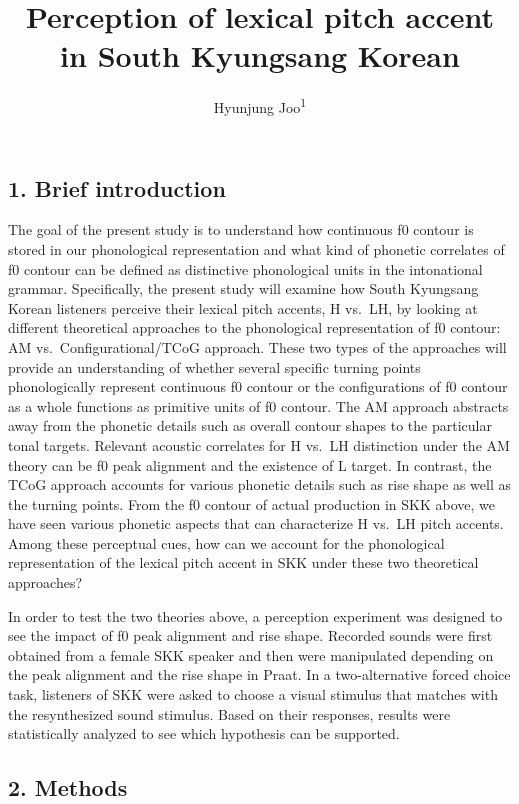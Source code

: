\documentclass[
  man,floatsintext]{apa6}
\title{Perception of lexical pitch accent in South Kyungsang Korean}
\author{Hyunjung Joo\textsuperscript{1}}
\date{}
\affiliation{\vspace{0.5cm}\textsuperscript{1} Rutgers University}
\begin{document}
\maketitle

\hypertarget{brief-introduction}{%
\subsection{1. Brief introduction}\label{brief-introduction}}

The goal of the present study is to understand how continuous f0 contour is stored in our phonological representation and what kind of phonetic correlates of f0 contour can be defined as distinctive phonological units in the intonational grammar. Specifically, the present study will examine how South Kyungsang Korean listeners perceive their lexical pitch accents, H vs.~LH, by looking at different theoretical approaches to the phonological representation of f0 contour: AM vs.~Configurational/TCoG approach. These two types of the approaches will provide an understanding of whether several specific turning points phonologically represent continuous f0 contour or the configurations of f0 contour as a whole functions as primitive units of f0 contour. The AM approach abstracts away from the phonetic details such as overall contour shapes to the particular tonal targets. Relevant acoustic correlates for H vs.~LH distinction under the AM theory can be f0 peak alignment and the existence of L target. In contrast, the TCoG approach accounts for various phonetic details such as rise shape as well as the turning points. From the f0 contour of actual production in SKK above, we have seen various phonetic aspects that can characterize H vs.~LH pitch accents. Among these perceptual cues, how can we account for the phonological representation of the lexical pitch accent in SKK under these two theoretical approaches?

In order to test the two theories above, a perception experiment was designed to see the impact of f0 peak alignment and rise shape. Recorded sounds were first obtained from a female SKK speaker and then were manipulated depending on the peak alignment and the rise shape in Praat. In a two-alternative forced choice task, listeners of SKK were asked to choose a visual stimulus that matches with the resynthesized sound stimulus. Based on their responses, results were statistically analyzed to see which hypothesis can be supported.

\hypertarget{methods}{%
\subsection{2. Methods}\label{methods}}
\end{document}
